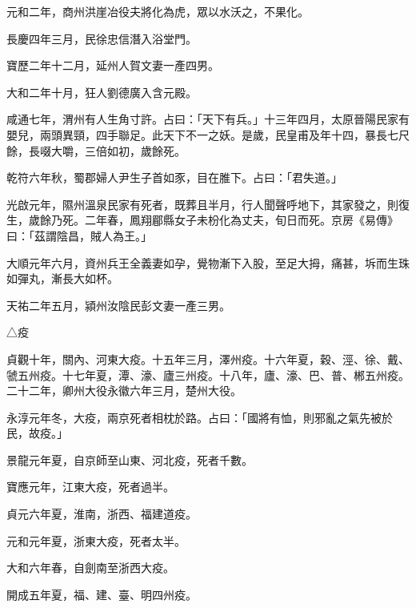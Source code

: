 \begin{pinyinscope}
 元和二年，商州洪崖冶役夫將化為虎，眾以水沃之，不果化。



 長慶四年三月，民徐忠信潛入浴堂門。



 寶歷二年十二月，延州人賀文妻一產四男。



 大和二年十月，狂人劉德廣入含元殿。



 咸通七年，渭州有人生角寸許。占曰：「天下有兵。」十三年四月，太原晉陽民家有嬰兒，兩頭異頸，四手聯足。此天下不一之妖。是歲，民皇甫及年十四，暴長七尺餘，長啜大嚼，三倍如初，歲餘死。



 乾符六年秋，蜀郡婦人尹生子首如豕，目在脽下。占曰：「君失道。」



 光啟元年，隰州溫泉民家有死者，既葬且半月，行人聞聲呼地下，其家發之，則復生，歲餘乃死。二年春，鳳翔郿縣女子未枌化為丈夫，旬日而死。京房《易傳》曰：「茲謂陰昌，賊人為王。」



 大順元年六月，資州兵王全義妻如孕，覺物漸下入股，至足大拇，痛甚，坼而生珠如彈丸，漸長大如杯。



 天祐二年五月，潁州汝陰民彭文妻一產三男。



 △疫



 貞觀十年，關內、河東大疫。十五年三月，澤州疫。十六年夏，穀、涇、徐、戴、虢五州疫。十七年夏，潭、濠、廬三州疫。十八年，廬、濠、巴、普、郴五州疫。二十二年，卿州大役永徽六年三月，楚州大役。



 永淳元年冬，大疫，兩京死者相枕於路。占曰：「國將有恤，則邪亂之氣先被於民，故疫。」



 景龍元年夏，自京師至山東、河北疫，死者千數。



 寶應元年，江東大疫，死者過半。



 貞元六年夏，淮南，浙西、福建道疫。



 元和元年夏，浙東大疫，死者太半。



 大和六年春，自劍南至浙西大疫。



 開成五年夏，福、建、臺、明四州疫。




\end{pinyinscope}
